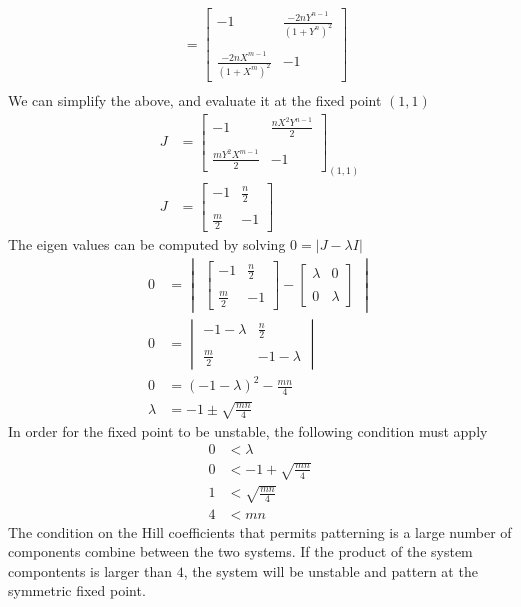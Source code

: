 \documentclass[10pt]{article}
\begin{document}
\begin{enumerate}
\begin{enumerate}
\begin{align*}
 &= \begin{bmatrix} -1 & \frac{-2nY^{n-1}}{(1+Y^n)^2} \\ \\  \frac{-2nX^{m-1}}{(1+X^m)^2} & -1 \end{bmatrix}\\
\end{align*}
We can simplify the above, and evaluate it at the fixed point $(1,1)$ \begin{align*}
J &= \begin{bmatrix} -1 & \frac{nX^2Y^{n-1}}{2} \\ \\  \frac{mY^2X^{m-1}}{2} & -1 \end{bmatrix}_{(1,1)}\\
J &= \begin{bmatrix} -1 & \frac{n}{2} \\ \\  \frac{m}{2} & -1 \end{bmatrix}
\end{align*}
The eigen values can be computed by solving $0 = \lvert J - \lambda I \rvert$
\begin{align*}
0 &= \begin{vmatrix} \begin{bmatrix} -1 & \frac{n}{2} \\ \\  \frac{m}{2} & -1 \end{bmatrix} - \begin{bmatrix} \lambda & 0 \\ \\  0 & \lambda \end{bmatrix} \end{vmatrix} \\
0 &= \begin{vmatrix} -1 - \lambda & \frac{n}{2} \\ \\  \frac{m}{2} & -1 -\lambda \end{vmatrix} \\
0 &= (-1 - \lambda)^2 - \frac{m n}{4} \\
\lambda &= -1 \pm \sqrt{\frac{mn}{4}}
\end{align*}
In order for the fixed point to be unstable, the following condition must apply
\begin{align*}
0 &< \lambda \\
0 &< -1 + \sqrt{\frac{mn}{4}} \\
1 &< \sqrt{\frac{mn}{4}} \\
4 &< mn
\end{align*}
The condition on the Hill coefficients that permits patterning is a large number of components combine between the two systems. If the product of the system compontents is larger than $4$, the system will be unstable and pattern at the symmetric fixed point.
\end{enumerate}
\end{enumerate}
\end{document}
